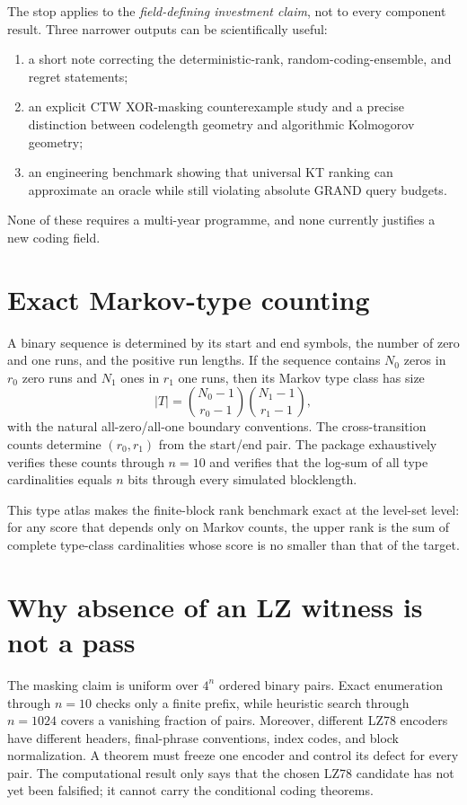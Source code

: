 \documentclass[11pt]{article}
\begin{document}
The stop applies to the \emph{field-defining investment claim}, not to every component result.  Three narrower outputs can be scientifically useful:
\begin{enumerate}
  \item a short note correcting the deterministic-rank, random-coding-ensemble, and regret statements;
  \item an explicit CTW XOR-masking counterexample study and a precise distinction between codelength geometry and algorithmic Kolmogorov geometry;
  \item an engineering benchmark showing that universal KT ranking can approximate an oracle while still violating absolute GRAND query budgets.
\end{enumerate}
None of these requires a multi-year programme, and none currently justifies a new coding field.

\appendix
\section{Exact Markov-type counting}

A binary sequence is determined by its start and end symbols, the number of zero and one runs, and the positive run lengths.  If the sequence contains $N_0$ zeros in $r_0$ zero runs and $N_1$ ones in $r_1$ one runs, then its Markov type class has size
\begin{equation}
 |T|=\binom{N_0-1}{r_0-1}\binom{N_1-1}{r_1-1},
\end{equation}
with the natural all-zero/all-one boundary conventions.  The cross-transition counts determine $(r_0,r_1)$ from the start/end pair.  The package exhaustively verifies these counts through $n=10$ and verifies that the log-sum of all type cardinalities equals $n$ bits through every simulated blocklength.

This type atlas makes the finite-block rank benchmark exact at the level-set level: for any score that depends only on Markov counts, the upper rank is the sum of complete type-class cardinalities whose score is no smaller than that of the target.

\section{Why absence of an LZ witness is not a pass}

The masking claim is uniform over $4^n$ ordered binary pairs.  Exact enumeration through $n=10$ checks only a finite prefix, while heuristic search through $n=1024$ covers a vanishing fraction of pairs.  Moreover, different LZ78 encoders have different headers, final-phrase conventions, index codes, and block normalization.  A theorem must freeze one encoder and control its defect for every pair.  The computational result only says that the chosen LZ78 candidate has not yet been falsified; it cannot carry the conditional coding theorems.
\end{document}
